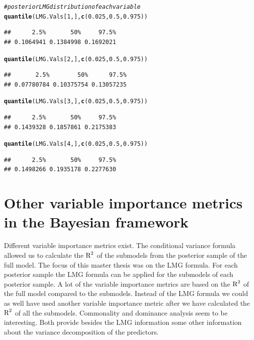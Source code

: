 \documentclass[11pt,a4paper,twoside]{book}\usepackage[]{graphicx}\usepackage[]{color}
\makeatletter
\newcommand{\hlnum}[1]{\textcolor[rgb]{0.686,0.059,0.569}{#1}}%
\newcommand{\hlcom}[1]{\textcolor[rgb]{0.678,0.584,0.686}{\textit{#1}}}%
\newcommand{\hlstd}[1]{\textcolor[rgb]{0.345,0.345,0.345}{#1}}%
\newcommand{\hlkwd}[1]{\textcolor[rgb]{0.737,0.353,0.396}{\textbf{#1}}}%
\newenvironment{kframe}{%
 \def\at@end@of@kframe{}%
 \ifinner\ifhmode%
  \def\at@end@of@kframe{\end{minipage}}%
  \begin{minipage}{\columnwidth}%
 \fi\fi%
 \def\FrameCommand##1{\hskip\@totalleftmargin \hskip-\fboxsep
 \colorbox{shadecolor}{##1}\hskip-\fboxsep
     \hskip-\linewidth \hskip-\@totalleftmargin \hskip\columnwidth}%
 \MakeFramed {\advance\hsize-\width
   \@totalleftmargin\z@ \linewidth\hsize
   \@setminipage}}%
 {\par\unskip\endMakeFramed%
 \at@end@of@kframe}
\newenvironment{knitrout}{}{} %
\makeatother
\begin{document}
\begin{knitrout}
\begin{kframe}
\begin{alltt}
\hlcom{# posterior LMG distribution of each variable}
\hlkwd{quantile}\hlstd{(LMG.Vals[}\hlnum{1}\hlstd{,],} \hlkwd{c}\hlstd{(}\hlnum{0.025}\hlstd{,} \hlnum{0.5}\hlstd{,} \hlnum{0.975}\hlstd{))}
\end{alltt}
\begin{verbatim}
##      2.5%       50%     97.5% 
## 0.1064941 0.1384998 0.1692021
\end{verbatim}
\begin{alltt}
\hlkwd{quantile}\hlstd{(LMG.Vals[}\hlnum{2}\hlstd{,],} \hlkwd{c}\hlstd{(}\hlnum{0.025}\hlstd{,} \hlnum{0.5}\hlstd{,} \hlnum{0.975}\hlstd{))}
\end{alltt}
\begin{verbatim}
##       2.5%        50%      97.5% 
## 0.07780784 0.10375754 0.13057235
\end{verbatim}
\begin{alltt}
\hlkwd{quantile}\hlstd{(LMG.Vals[}\hlnum{3}\hlstd{,],} \hlkwd{c}\hlstd{(}\hlnum{0.025}\hlstd{,} \hlnum{0.5}\hlstd{,} \hlnum{0.975}\hlstd{))}
\end{alltt}
\begin{verbatim}
##      2.5%       50%     97.5% 
## 0.1439328 0.1857861 0.2175383
\end{verbatim}
\begin{alltt}
\hlkwd{quantile}\hlstd{(LMG.Vals[}\hlnum{4}\hlstd{,],} \hlkwd{c}\hlstd{(}\hlnum{0.025}\hlstd{,} \hlnum{0.5}\hlstd{,} \hlnum{0.975}\hlstd{))}
\end{alltt}
\begin{verbatim}
##      2.5%       50%     97.5% 
## 0.1498266 0.1935178 0.2277630
\end{verbatim}
\end{kframe}
\end{knitrout}















\chapter{Other variable importance metrics in the Bayesian framework}

Different variable importance metrics exist. The conditional variance formula allowed us to calculate the $\text{R}^2$ of the submodels from the posterior sample of the full model. The focus of this master thesis was on the LMG formula. For each posterior sample the LMG formula can be applied for the submodels of each posterior sample. A lot of the variable importance metrics are based on the $\text{R}^2$ of the full model compared to the submodels. Instead of the LMG formula we could as well have used another variable importance metric after we have calculated the $\text{R}^2$ of all the submodels. Commonality and dominance analysis seem to be interesting. Both provide besides the LMG information some other information about the variance decomposition of the predictors. 
\end{document}
